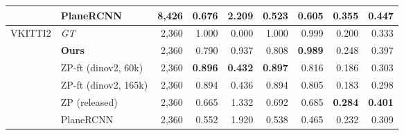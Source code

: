 \begin{table}[t]
\begin{tabular}{l l r r r r r r r}
 & PlaneRCNN & 8,426 & 0.676 & 2.209 & 0.523 & 0.605 & 0.355 & 0.447 \\
\midrule
VKITTI2 & \textit{GT} & 2,360 & 1.000 & 0.000 & 1.000 & 0.999 & 0.200 & 0.333 \\
 & \textbf{Ours} & 2,360 & 0.790 & 0.937 & 0.808 & \textbf{0.989} & 0.248 & 0.397 \\
 & ZP-ft (dinov2, 60k) & 2,360 & \textbf{0.896} & \textbf{0.432} & \textbf{0.897} & 0.816 & 0.186 & 0.303 \\
 & ZP-ft (dinov2, 165k) & 2,360 & 0.894 & 0.436 & 0.894 & 0.805 & 0.183 & 0.298 \\
 & ZP (released) & 2,360 & 0.665 & 1.332 & 0.692 & 0.685 & \textbf{0.284} & \textbf{0.401} \\
 & PlaneRCNN & 2,360 & 0.552 & 1.920 & 0.538 & 0.465 & 0.232 & 0.309 \\
\bottomrule
\end{tabular}
\end{table}